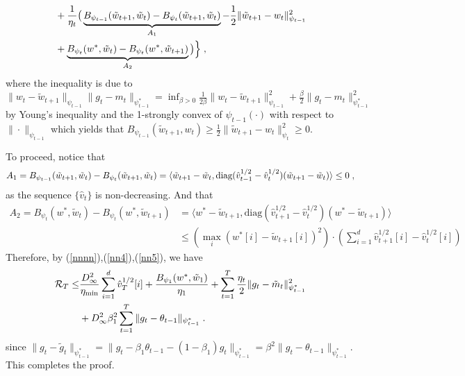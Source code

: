 \documentclass[11pt]{article}
\makeatletter
\renewenvironment{proof}[1][\proofname]{%
   \par\pushQED{\qed}\normalfont%
   \topsep6\p@\@plus6\p@\relax
   \trivlist\item[\hskip\labelsep\bfseries#1]%
   \ignorespaces
}{%
   \popQED\endtrivlist\@endpefalse
}
\theoremstyle{k}
\makeatother
\begin{document}
\begin{proof}
\begin{equation}
\begin{aligned}
 &  + \frac{1}{\eta_t} \big(\underbrace{B_{\psi_{t-1}}(\tilde{w}_{t+1}, \tilde{w}_{t}) - B_{\psi_t}(\tilde{w}_{t+1}, \tilde{w}_{t}) }_{A_1}- \frac{1}{2} \| \tilde{w}_{t+1} - w_t \|_{\psi_{t-1}}^2\\
 &+\underbrace{B_{\psi_t}( w^*, \tilde{w}_{t}) -B_{\psi_t}(w^*,  \tilde{w}_{t+1} )}_{A_2}  \big) \Big\} \;,
\end{aligned}
\end{equation}
where the inequality is due to $ \| w_t - \tilde{w}_{t+1}   \|_{\psi_{t-1}} \| g_t - m_t  \|_{\psi_{t-1}^*} = \inf_{ \beta > 0 }   \frac{1}{2\beta} \| w_t - \tilde{w}_{t+1} \|_{\psi_{t-1}}^2 +  \frac{\beta}{2} \| g_t - m_t  \|_{\psi_{t-1}^*}^2$ by Young's inequality and the 1-strongly convex of $\psi_{t-1}(\cdot)$ with respect to $\| \cdot \|_{\psi_{t-1}}$ which yields that $B_{\psi_{t-1}}(\tilde{w}_{t+1}, w_t )  \geq \frac{1}{2} \| \tilde{w}_{t+1} -  w_t  \|^2_{\psi_t} \geq 0$. 

To proceed, notice that
\begin{equation} \label{nn5}
\begin{aligned}
A_1 =  B_{\psi_{t-1}}(\tilde{w}_{t+1}, \tilde{w}_{t}) - B_{\psi_t}(\tilde{w}_{t+1}, \tilde{w}_{t})  = \langle \tilde{w}_{t+1} - \tilde{w}_{t} , \text{diag}(\hat{v}_{t-1}^{1/2} -\hat{v}_t^{1/2} ) ( \tilde{w}_{t+1}- \tilde{w}_{t} ) \rangle \leq 0 \;,
\end{aligned}
\end{equation}
as the sequence $\{\hat{v}_t\}$ is non-decreasing. And that
\begin{equation}  \label{nn4}
\begin{aligned}
A_2 = B_{\psi_t}( w^*, \tilde{w}_{t}) -B_{\psi_t}(w^*,  \tilde{w}_{t+1} )  &= \langle w^* - \tilde{w}_{t+1}  , \text{diag}(\hat{v}_{t+1}^{1/2} -\hat{v}_t^{1/2} ) ( w^* - \tilde{w}_{t+1}  ) \rangle\\
  & \leq ( \max_i (w^*[i] -  \tilde{w}_{t+1} [i] )^2  )\cdot ( \sum_{i=1}^d \hat{v}_{t+1}^{1/2}[i] -\hat{v}_t^{1/2}[i] )
\end{aligned}
\end{equation}
Therefore, by (\ref{nnnn}),(\ref{nn4}),(\ref{nn5}), we have
\begin{equation}\notag
\begin{aligned}
\mathcal{R}_T \leq & \frac{D_{\infty}^2}{\eta_{\min}}  \sum_{i=1}^d \hat{v}_{T}^{1/2}[i] + \frac{ B_{\psi_1}(w^*, \tilde{w}_{1})}{\eta_1}
+ \sum_{t=1}^T\frac{\eta_t}{2} \| g_t - \tilde{m}_t  \|_{\psi_{t-1}^*}^2  \\
& +D_{\infty}^2 \beta_1^2  \sum_{t=1}^T \| g_t - \theta_{t-1}  \|_{\psi_{t-1}^*}  \;.
\end{aligned}
\end{equation}
since $  \| g_t - \tilde{g}_t  \|_{\psi_{t-1}^*} =  \| g_t - \beta_1 \theta_{t-1} -(1- \beta_1) g_t \|_{\psi_{t-1}^*} = \beta^2 \| g_t - \theta_{t-1}  \|_{\psi_{t-1}^*} $.
This completes the proof.

\end{proof}
\end{document}
